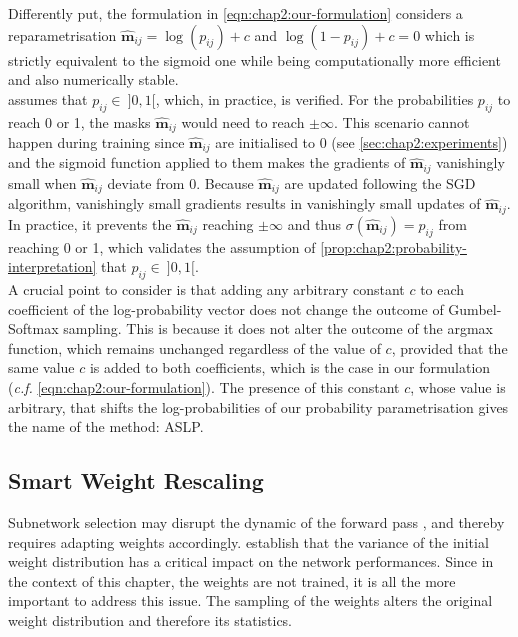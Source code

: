 Differently put, the formulation in \cref{eqn:chap2:our-formulation} considers a
reparametrisation $\bm{\hat{m}}_{ij} = \log(p_{ij})+c$ and $\log(1-p_{ij})+ c =0$ which is strictly
equivalent to the sigmoid one while being computationally more efficient and
also numerically stable.\\


 assumes that $p_{ij}\in ~ ]0,1[$,
which, in practice, is verified. For the probabilities $p_{ij}$ to reach 0 or 1,
the masks $\bm{\hat{m}}_{ij}$  would need to reach $\pm\infty$. This scenario
cannot happen during training since $\bm{\hat{m}}_{ij}$ are initialised to 0
(see \cref{sec:chap2:experiments}) and the sigmoid function applied to them
makes the gradients of $\bm{\hat{m}}_{ij}$ vanishingly small when
$\bm{\hat{m}}_{ij}$ deviate from 0. Because $\bm{\hat{m}}_{ij}$ are updated
following the \ac{SGD} algorithm, vanishingly small gradients results in
vanishingly small updates of $\bm{\hat{m}}_{ij}$. In practice, it prevents the
$\bm{\hat{m}}_{ij}$ reaching $\pm\infty$ and thus
$\sigma(\bm{\hat{m}}_{ij})=p_{ij}$ from reaching 0 or 1, which validates the
assumption of \cref{prop:chap2:probability-interpretation} that $p_{ij}\in ~
]0,1[$.\\

A crucial point to consider is that adding any arbitrary constant $c$ to each
coefficient of the log-probability vector does not change the outcome of
Gumbel-Softmax sampling. This is because it does not alter the outcome of the
argmax function, which remains unchanged regardless of the value of $c$,
provided that the same value $c$ is added to both coefficients, which is the case
in our formulation (\emph{c.f.} \cref{eqn:chap2:our-formulation}). The
presence of this constant $c$, whose value is arbitrary, that shifts the
log-probabilities of our probability parametrisation gives the name of the
method: \acl{ASLP}.\\



\subsection{Smart Weight Rescaling}
\label{sec:chap2:smart-rescale}
Subnetwork selection may disrupt the dynamic of the forward pass
\cite{DBLP:conf/iccv/HeZRS15,DBLP:conf/cvpr/RamanujanWKFR20}, and thereby
requires adapting weights accordingly. \cite{DBLP:conf/iccv/HeZRS15} establish
that the variance of the initial weight distribution has a critical impact on
the network performances. Since in the context of this chapter, the weights are
not trained, it is all the more important to address this issue. The sampling of
the weights alters the original weight distribution and therefore its
statistics.\\

